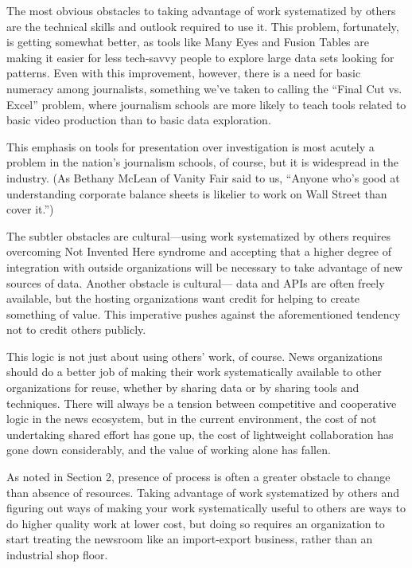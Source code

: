 The most obvious obstacles to taking advantage of work systematized
by others are the technical skills and outlook required to use it. This
problem, fortunately, is getting somewhat better, as tools like Many Eyes
and Fusion Tables are making it easier for less tech-savvy people to explore
large data sets looking for patterns. Even with this improvement,
however, there is a need for basic numeracy among journalists, something
we’ve taken to calling the ``Final Cut vs. Excel'' problem, where
journalism schools are more likely to teach tools related to basic video
production than to basic data exploration.

This emphasis on tools for presentation over investigation is most
acutely a problem in the nation’s journalism schools, of course, but it is
widespread in the industry. (As Bethany McLean of Vanity Fair said to
us, ``Anyone who’s good at understanding corporate balance sheets is
likelier to work on Wall Street than cover it.'')

The subtler obstacles are cultural—using work systematized by others
requires overcoming Not Invented Here syndrome and accepting that a
higher degree of integration with outside organizations will be necessary
to take advantage of new sources of data. Another obstacle is cultural— data and APIs are often freely available, but the hosting organizations
want credit for helping to create something of value. This imperative
pushes against the aforementioned tendency not to credit others publicly.

This logic is not just about using others’ work, of course. News organizations
should do a better job of making their work systematically
available to other organizations for reuse, whether by sharing data or by
sharing tools and techniques. There will always be a tension between
competitive and cooperative logic in the news ecosystem, but in the
current environment, the cost of not undertaking shared effort has gone
up, the cost of lightweight collaboration has gone down considerably,
and the value of working alone has fallen.

As noted in Section 2, presence of process is often a greater obstacle to
change than absence of resources. Taking advantage of work systematized
by others and figuring out ways of making your work systematically
useful to others are ways to do higher quality work at lower cost,
but doing so requires an organization to start treating the newsroom like
an import-export business, rather than an industrial shop floor.

